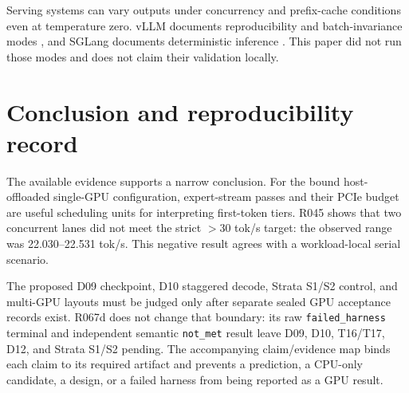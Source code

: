\documentclass[11pt]{article}
\begin{document}
Serving systems can vary outputs under concurrency and prefix-cache conditions even at temperature zero. vLLM documents reproducibility and batch-invariance modes \cite{vllmrepro,vllmbatch}, and SGLang documents deterministic inference \cite{sglang}. This paper did not run those modes and does not claim their validation locally.

\section{Conclusion and reproducibility record}

The available evidence supports a narrow conclusion. For the bound host-offloaded single-GPU configuration, expert-stream passes and their PCIe budget are useful scheduling units for interpreting first-token tiers. R045 shows that two concurrent lanes did not meet the strict $>30$ tok/s target: the observed range was 22.030--22.531 tok/s. This negative result agrees with a workload-local serial scenario.

The proposed D09 checkpoint, D10 staggered decode, Strata S1/S2 control, and multi-GPU layouts must be judged only after separate sealed GPU acceptance records exist. R067d does not change that boundary: its raw \texttt{failed\_harness} terminal and independent semantic \texttt{not\_met} result leave D09, D10, T16/T17, D12, and Strata S1/S2 pending. The accompanying claim/evidence map binds each claim to its required artifact and prevents a prediction, a CPU-only candidate, a design, or a failed harness from being reported as a GPU result.



\end{document}
